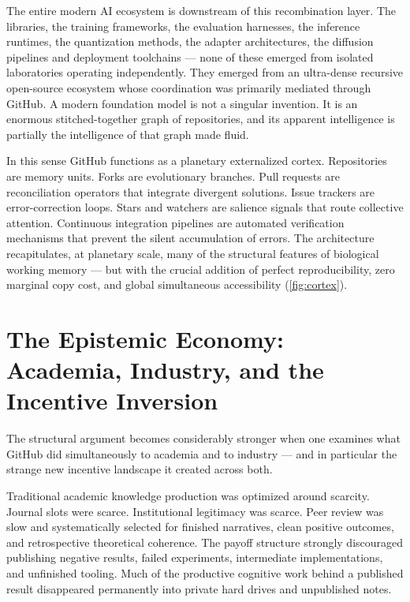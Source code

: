 \documentclass[12pt]{article}
\begin{document}
The entire modern AI ecosystem is downstream of this recombination layer. The
libraries, the training frameworks, the evaluation harnesses, the inference
runtimes, the quantization methods, the adapter architectures, the diffusion
pipelines and deployment toolchains --- none of these emerged from isolated
laboratories operating independently. They emerged from an ultra-dense recursive
open-source ecosystem whose coordination was primarily mediated through GitHub.
A modern foundation model is not a singular invention. It is an enormous
stitched-together graph of repositories, and its apparent intelligence is
partially the intelligence of that graph made fluid.

In this sense GitHub functions as a planetary externalized cortex. Repositories
are memory units. Forks are evolutionary branches. Pull requests are
reconciliation operators that integrate divergent solutions. Issue trackers are
error-correction loops. Stars and watchers are salience signals that route
collective attention. Continuous integration pipelines are automated verification
mechanisms that prevent the silent accumulation of errors. The architecture
recapitulates, at planetary scale, many of the structural features of biological
working memory --- but with the crucial addition of perfect reproducibility, zero
marginal copy cost, and global simultaneous accessibility (\cref{fig:cortex}).

\section{The Epistemic Economy: Academia, Industry, and the Incentive Inversion}

The structural argument becomes considerably stronger when one examines what
GitHub did simultaneously to academia and to industry --- and in particular the
strange new incentive landscape it created across both.

Traditional academic knowledge production was optimized around scarcity.
Journal slots were scarce. Institutional legitimacy was scarce. Peer review
was slow and systematically selected for finished narratives, clean positive
outcomes, and retrospective theoretical coherence. The payoff structure strongly
discouraged publishing negative results, failed experiments, intermediate
implementations, and unfinished tooling. Much of the productive cognitive work
behind a published result disappeared permanently into private hard drives and
unpublished notes.
\end{document}
